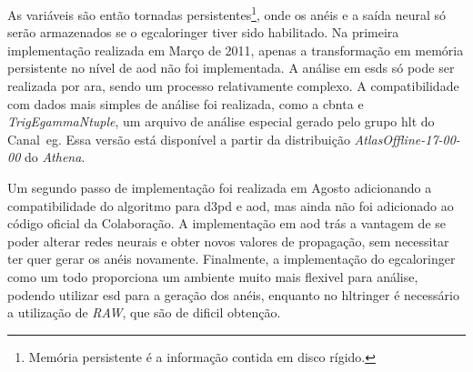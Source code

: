 As variáveis são então tornadas persistentes\footnote{Memória persistente é a informação
contida em disco rígido.}, onde os anéis e a saída neural só serão armazenados
se o \gls{egcaloringer} tiver sido habilitado. Na primeira implementação
realizada em Março de 2011, apenas a transformação em memória persistente 
no nível de \gls{aod} não foi implementada. A análise em \glspl{esd} 
só pode ser realizada por \gls{ara},
sendo um processo relativamente complexo.
A compatibilidade com dados mais simples de análise foi realizada, como a
\gls{cbnta} e \emph{TrigEgammaNtuple}, um arquivo de análise especial gerado
pelo grupo \gls{hlt} do Canal~\gls{eg}. Essa versão está disponível a partir da
distribuição \emph{AtlasOffline-17-00-00} do \emph{Athena}.

Um segundo passo de implementação foi realizada em Agosto adicionando a
compatibilidade do algoritmo para \gls{d3pd} e \gls{aod}, mas ainda não foi
adicionado ao código oficial da Colaboração. A implementação em \gls{aod} trás a
vantagem de se poder alterar redes neurais e obter novos valores de propagação,
sem necessitar ter quer gerar os anéis novamente. Finalmente, a implementação do 
\gls{egcaloringer} como um todo proporciona um ambiente muito
mais flexivel para análise, podendo utilizar \gls{esd} para a geração dos anéis,
enquanto no \gls{hltringer} é necessário a utilização de \emph{RAW}, que são de
dificil obtenção.



